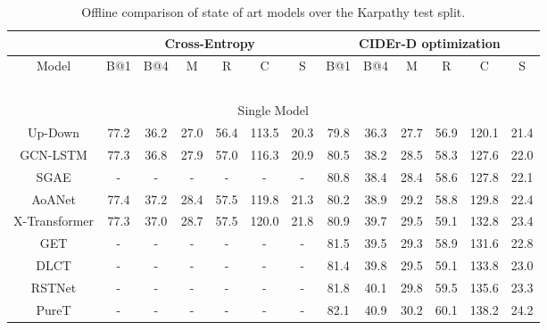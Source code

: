 \begin{table*}[htb!]
  \centering
  \footnotesize
  \caption{Offline comparison of state of art models over the Karpathy test split.}
  \begin{tabular}{| c | c  c  c  c  c  c | c  c  c  c  c  c  |} 
 \hline
 \multicolumn{1}{|c|}{} & \multicolumn{6}{c|}{Cross-Entropy} & \multicolumn{6}{c|}{CIDEr-D optimization}\\
 \hline
 Model & B@1 & B@4 & M & R & C & S & B@1 & B@4 & M & R & C & S \\
 \hline
 \multicolumn{13}{c}{\textcolor{white}{XXX}}\\
 \hline
 \multicolumn{13}{|c|}{Single Model}\\
 \hline
 Up-Down \cite{anderson2018bottom} & 77.2 & 36.2 & 27.0 & 56.4 & 113.5 & 20.3 & 79.8 & 36.3 & 27.7 & 56.9 & 120.1 & 21.4\\
 \hline
 GCN-LSTM \cite{yao2018exploring} & 77.3 & 36.8 & 27.9 & 57.0 & 116.3 & 20.9 & 80.5 & 38.2 & 28.5 & 58.3 & 127.6 & 22.0\\
 \hline
 SGAE \cite{yang2019auto} & - & - & - & - & - & - & 80.8 & 38.4 & 28.4 & 58.6 & 127.8 & 22.1\\
 \hline
 AoANet \cite{huang2019attention}& 77.4 & 37.2 & 28.4 & 57.5 & 119.8 & 21.3 & 80.2 & 38.9 & 29.2 & 58.8 & 129.8 & 22.4\\
 \hline
 X-Transformer \cite{pan2020x} & 77.3 & 37.0 & 28.7 & 57.5 & 120.0 & 21.8 & 80.9 & 39.7 & 29.5 & 59.1 & 132.8 & 23.4 \\
 \hline
 GET \cite{ji2021improving} & - & - & - & - & - & - & 81.5 & 39.5 & 29.3 & 58.9 & 131.6 & 22.8 \\
 \hline
 DLCT \cite{luo2021dual} & - & - & - & - & - & - & 81.4 & 39.8 & 29.5 & 59.1 & 133.8 & 23.0 \\
 \hline
 RSTNet \cite{zhang2021rstnet} & - & - & - & - & - & - & 81.8 & 40.1 & 29.8 & 59.5 & 135.6 & 23.3 \\
 \hline
 PureT \cite{wang2022end} & - & - & - & - & - & - & 82.1 & 40.9 & 30.2 & 60.1 & 138.2 & 24.2 \\


\end{tabular}
\end{table*}
